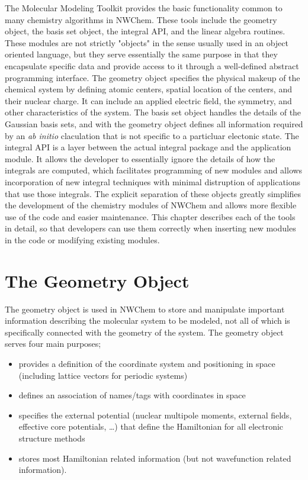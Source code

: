 \label{sec:mmt}

The Molecular Modeling Toolkit provides the basic functionality common to many
chemistry algorithms in NWChem.  These tools include the geometry object,
the basis set object, the integral API, and the linear algebra routines.  
These modules are not strictly
"objects" in the sense usually used in an object oriented language, but
they serve essentially the same purpose in that
they encapsulate specific data and provide access to it through a well-defined
abstract programming interface.  The geometry object specifies the
physical makeup of the chemical system by defining atomic centers, 
spatial location of the centers, and their nuclear charge.  It can include
an applied electric field, the symmetry, and other characteristics of the
system.  The basis set object handles the details of the Gaussian basis sets,
and with the geometry object defines all information required by an 
{\em ab initio} claculation that is not specific to a 
particluar electonic state.  The integral API is a layer between the actual
integral package and the application module.  It allows the developer to 
essentially ignore the details of how the integrals are
computed, which facilitates programming of new modules and allows 
incorporation of new integral
techniques with minimal distruption of applications that use those integrals.
The explicit separation of these objects greatly simplifies the development
of the chemistry modules of NWChem and allows more flexible use of the code
and easier maintenance.
This chapter describes each of the tools in detail,
so that developers can use them correctly when inserting new modules in
the code or modifying existing modules.  

\section{The Geometry Object}

\label{sec:geometry}

The geometry object is used in NWChem to store and manipulate important
information describing the molecular system to be modeled, not all of
which is specifically connected with the geometry of the system.  The
geometry object serves four main purposes; 
\begin{itemize}
\item provides a definition of the coordinate system and positioning in space
  (including lattice vectors for periodic systems)
\item defines an association of names/tags with coordinates in space
\item specifies the external potential (nuclear multipole
  moments, external fields, effective core potentials, \ldots) that
  define the Hamiltonian for all electronic structure methods
\item stores most Hamiltonian related information (but
  not wavefunction related information).
\end{itemize}

